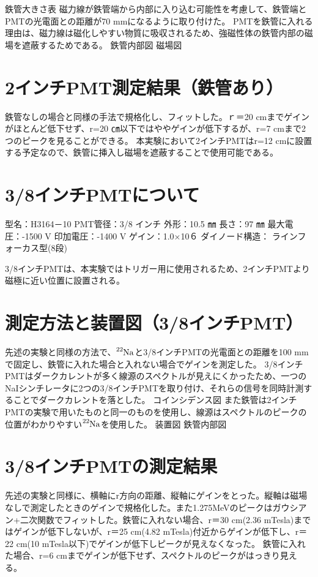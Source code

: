 鉄管大きさ表
磁力線が鉄管端から内部に入り込む可能性を考慮して、鉄管端とPMTの光電面との距離が70 mmになるように取り付けた。
PMTを鉄管に入れる理由は、磁力線は磁化しやすい物質に吸収されるため、強磁性体の鉄管内部の磁場を遮蔽するためである。
鉄管内部図
磁場図

\section{2インチPMT測定結果（鉄管あり）}
鉄管なしの場合と同様の手法で規格化し、フィットした。ｒ＝20 cmまでゲインがほとんど低下せず、r=20 ㎝以下ではややゲインが低下するが、r=7 cmまで2つのピークを見ることができる。
本実験において2インチPMTはr=12 cmに設置する予定なので、鉄管に挿入し磁場を遮蔽することで使用可能である。

\section{3/8インチPMTについて}
型名：H3164－10
PMT管径：3/8 インチ
外形：10.5 ㎜
長さ：97 ㎜
最大電圧：-1500 V
印加電圧：-1400 V
ゲイン：1.0×10６
ダイノード構造：
ラインフォーカス型(8段)

3/8インチPMTは、本実験ではトリガー用に使用されるため、2インチPMTより磁極に近い位置に設置される。

\section{測定方法と装置図（3/8インチPMT）}

先述の実験と同様の方法で、$\ce{^{22}Na}$と3/8インチPMTの光電面との距離を100 mmで固定し、鉄管に入れた場合と入れない場合でゲインを測定した。
3/8インチPMTはダークカレントが多く線源のスペクトルが見えにくかったため、一つのNaIシンチレータに2つの3/8インチPMTを取り付け、それらの信号を同時計測することでダークカレントを落とした。
コインシデンス図
また鉄管は2インチPMTの実験で用いたものと同一のものを使用し、線源はスペクトルのピークの位置がわかりやすい$\ce{^{22}Na}$を使用した。
装置図
鉄管内部図

\section{3/8インチPMTの測定結果}
先述の実験と同様に、横軸にr方向の距離、縦軸にゲインをとった。縦軸は磁場なしで測定したときのゲインで規格化した。また1.275MeVのピークはガウシアン+二次関数でフィットした。鉄管に入れない場合、r＝30 cm(2.36 mTesla)まではゲインが低下しないが、r＝25 cm(4.82 mTesla)付近からゲインが低下し、r＝22 cm(10 mTesla以下)でゲインが低下しピークが見えなくなった。
鉄管に入れた場合、r=6 cmまでゲインが低下せず、スペクトルのピークがはっきり見える。

